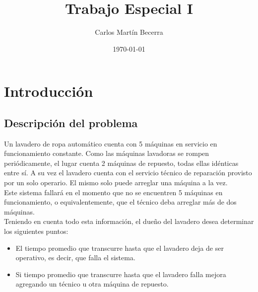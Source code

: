 \documentclass[10pt,a4paper]{article} %
\begin{document}
    \title{Trabajo Especial I}
        \author{Carlos Mart\'in Becerra}
            \date{\today} %
                
                    \maketitle
                        
                            \tableofcontents
                                
                                    \newpage
                                        \section{Introducci\'on}
                                            \subsection{Descripci\'on del problema}
                                                Un lavadero de ropa autom\'atico cuenta con 5 m\'aquinas en servicio en funcionamiento constante. Como las m\'aquinas lavadoras se rompen peri\'odicamente, el lugar cuenta 2 m\'aquinas de repuesto, todas ellas id\'enticas entre s\'i. A su vez el lavadero cuenta con el servicio t\'ecnico de reparaci\'on provisto por un solo operario. El mismo solo puede arreglar una m\'aquina a la vez.\\
                                                    Este sistema fallar\'a en el momento que no se encuentren 5 m\'aquinas en funcionamiento, o equivalentemente, que el t\'ecnico deba arreglar m\'as de dos m\'aquinas.\\
                                                        Teniendo en cuenta todo esta informaci\'on, el due\~no del lavadero desea determinar los siguientes puntos:

                                                            \begin{itemize}
                                                                \item El tiempo promedio que transcurre hasta que el lavadero deja de ser operativo, es decir, que falla el sistema.
                                                                    \item Si tiempo promedio que transcurre hasta que el lavadero falla mejora agregando un t\'ecnico u otra m\'aquina de repuesto.
                                                                        \end{itemize}
                                                                            
\end{document}
